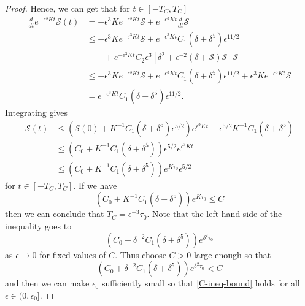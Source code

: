 \begin{proof}
	Hence, we can get that for \(t \in [-T_{C}, T_{C}]\) 
	\begin{equation*}
		\begin{aligned}
			\frac d {dt} e^{-\epsilon^3 K t} \mathcal S(t) &= - \epsilon^3 K e^{-\epsilon^3 K t} \mathcal S  + e^{-\epsilon^3 K t} \frac d {dt} \mathcal S \\
			&\leq - \epsilon^3 K e^{-\epsilon^3 K t} \mathcal S  + e^{-\epsilon^3 K t}C_1(\delta + \delta^5) \epsilon^{11/2} \\
			&\qquad+ e^{-\epsilon^3 K t}C_2 \epsilon^3\left[ \delta^2 + \epsilon^{-2}(\delta + \mathcal S) \mathcal S \right]\mathcal S \\
			&\leq - \epsilon^3 K e^{-\epsilon^3 K t} \mathcal S  +  e^{-\epsilon^3 K t}C_1(\delta + \delta^5) \epsilon^{11/2} + \epsilon^3 K e^{-\epsilon^3 K t}\mathcal S \\
			&= e^{-\epsilon^3 K t}C_1(\delta + \delta^5) \epsilon^{11/2}.
		\end{aligned}
	\end{equation*}
	Integrating gives
	\begin{equation*} 
		\begin{aligned}
			\mathcal S(t) &\leq \left( \mathcal S(0) + K^{-1} C_1 (\delta+\delta^5) \epsilon^{5/2} \right) e^{\epsilon^3 K t} - \epsilon^{5/2} K^{-1} C_1 (\delta + \delta^5) \\
			&\leq \left(C_0+ K^{-1} C_1 (\delta+\delta^5)  \right) \epsilon^{5/2}e^{\epsilon^3 K t} \\
			&\leq (C_0 + K^{-1} C_1 (\delta+\delta^5) ) e^{K\tau_0} \epsilon^{5/2}
		\end{aligned}
	\end{equation*}
	for \(t \in [-T_{C}, T_{C}]\). If we have 
	\begin{equation}\label{C-ineq-bound}
		(C_0 + K^{-1} C_1 (\delta+\delta^5) ) e^{K\tau_0}  \leq C
	\end{equation} 
	then we can conclude that \(T_C = \epsilon^{-3}\tau_0.\) Note that the left-hand side of the inequality goes to 
	\begin{equation*}
		(C_0 + \delta^{-2} C_1 (\delta+\delta^5) ) e^{\delta^2\tau_0}
	\end{equation*}
	as \(\epsilon \to 0\) for fixed values of \(C\). Thus choose \(C>0\) large enough so that
	\begin{equation*}
		(C_0 + \delta^{-2} C_1 (\delta+\delta^5) ) e^{\delta^2\tau_0} < C
	\end{equation*}
 	and then we can make \(\epsilon_0\) sufficiently small so that \cref{C-ineq-bound} holds for all \(\epsilon \in (0,\epsilon_0]\).
\end{proof}

